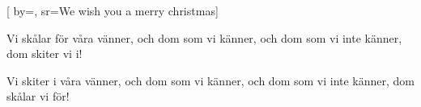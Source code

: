 
[
	by={},
	sr={We wish you a merry christmas}]

\beginverse*
Vi skålar för våra vänner,
och dom som vi känner,
och dom som vi inte känner,
dom skiter vi i!
\endverse

\beginverse*
Vi skiter i våra vänner,
och dom som vi känner,
och dom som vi inte känner,
dom skålar vi för!
\endverse
\endsong